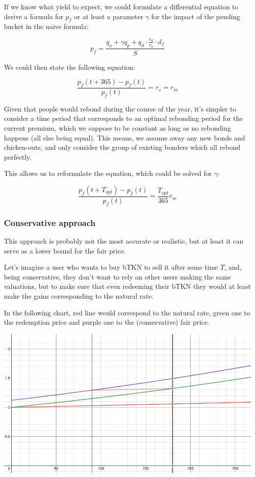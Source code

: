 \documentclass{article}
\begin{document}
If we know what yield to expect, we could formulate a differential equation to derive a formula for $p_f$ or at least a parameter $\gamma$ for the impact of the pending bucket in the naive formula:

\begin{equation}
  \label{eq:naive-beta}
   p_f = \frac{q_a + \gamma q_p + q_d \cdot \frac{r_d}{r_a} \cdot d_f}{S}
\end{equation}

We could then state the following equation:

\begin{equation}
  \label{eq:yield-eq}
  \frac{p_f(t + 365) - p_f(t)}{p_f(t)} = r_s = r_m 
\end{equation}

Given that people would rebond during the course of the year, it’s simpler to consider a time period that corresponds to an optimal rebonding period for the current premium, which we suppose to be constant as long as no rebonding happens (all else being equal). This means, we assume away any new bonds and chicken-outs, and only consider the group of existing bonders which all rebond perfectly.

This allows us to reformulate the equation, which could be solved for $\gamma$:

\begin{equation}
  \label{eq:yield-eq}
  \frac{p_f(t + T_{opt}) - p_f(t)}{p_f(t)} = \frac{T_{opt}}{365} r_m
\end{equation}

\subsubsection{Conservative approach}
This approach is probably not the most accurate or realistic, but at least it can serve as a lower bound for the fair price.

Let’s imagine a user who wants to buy bTKN to sell it after some time $T$, and, being conservative, they don’t want to rely on other users making the same valuations, but to make sure that even redeeming their bTKN they would at least make the gains corresponding to the natural rate.

In the following chart, red line would correspond to the natural rate, green one to the redemption price and purple one to the (conservative) fair price.

\includegraphics[width=\linewidth]{./ChickenBonds_Whitepaper_conservative_price.png}
\end{document}
